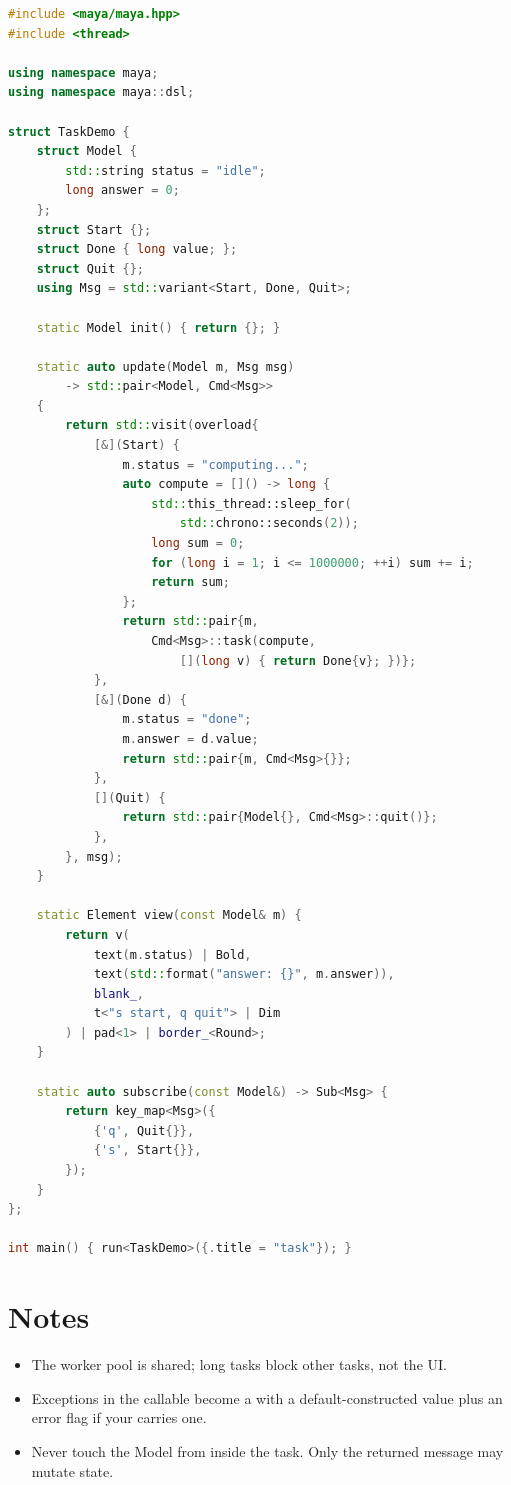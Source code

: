 \begin{lstlisting}[language=C++]
#include <maya/maya.hpp>
#include <thread>

using namespace maya;
using namespace maya::dsl;

struct TaskDemo {
    struct Model {
        std::string status = "idle";
        long answer = 0;
    };
    struct Start {};
    struct Done { long value; };
    struct Quit {};
    using Msg = std::variant<Start, Done, Quit>;

    static Model init() { return {}; }

    static auto update(Model m, Msg msg)
        -> std::pair<Model, Cmd<Msg>>
    {
        return std::visit(overload{
            [&](Start) {
                m.status = "computing...";
                auto compute = []() -> long {
                    std::this_thread::sleep_for(
                        std::chrono::seconds(2));
                    long sum = 0;
                    for (long i = 1; i <= 1000000; ++i) sum += i;
                    return sum;
                };
                return std::pair{m,
                    Cmd<Msg>::task(compute,
                        [](long v) { return Done{v}; })};
            },
            [&](Done d) {
                m.status = "done";
                m.answer = d.value;
                return std::pair{m, Cmd<Msg>{}};
            },
            [](Quit) {
                return std::pair{Model{}, Cmd<Msg>::quit()};
            },
        }, msg);
    }

    static Element view(const Model& m) {
        return v(
            text(m.status) | Bold,
            text(std::format("answer: {}", m.answer)),
            blank_,
            t<"s start, q quit"> | Dim
        ) | pad<1> | border_<Round>;
    }

    static auto subscribe(const Model&) -> Sub<Msg> {
        return key_map<Msg>({
            {'q', Quit{}},
            {'s', Start{}},
        });
    }
};

int main() { run<TaskDemo>({.title = "task"}); }
\end{lstlisting}

\section{Notes}

\begin{itemize}[leftmargin=*]
  \item The worker pool is shared; long tasks block other
    tasks, not the UI.
  \item Exceptions in the callable become a 
    with a default-constructed value plus an error flag if
    your  carries one.
  \item Never touch the Model from inside the task. Only
    the returned message may mutate state.
\end{itemize}

